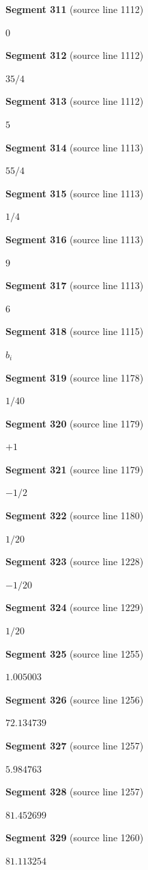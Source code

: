 \documentclass[11pt]{article}
\begin{document}
\textbf{Segment 311} (source line 1112)\par
\( 0 \)\par
\textbf{Segment 312} (source line 1112)\par
\( 35/4 \)\par
\textbf{Segment 313} (source line 1112)\par
\( 5 \)\par
\textbf{Segment 314} (source line 1113)\par
\( 55/4 \)\par
\textbf{Segment 315} (source line 1113)\par
\( 1/4 \)\par
\textbf{Segment 316} (source line 1113)\par
\( 9 \)\par
\textbf{Segment 317} (source line 1113)\par
\( 6 \)\par
\textbf{Segment 318} (source line 1115)\par
\( b_i \)\par
\textbf{Segment 319} (source line 1178)\par
\( 1/40 \)\par
\textbf{Segment 320} (source line 1179)\par
\( +1 \)\par
\textbf{Segment 321} (source line 1179)\par
\( -1/2 \)\par
\textbf{Segment 322} (source line 1180)\par
\( 1/20 \)\par
\textbf{Segment 323} (source line 1228)\par
\( -1/20 \)\par
\textbf{Segment 324} (source line 1229)\par
\( 1/20 \)\par
\textbf{Segment 325} (source line 1255)\par
\( 1.005003 \)\par
\textbf{Segment 326} (source line 1256)\par
\( 72.134739 \)\par
\textbf{Segment 327} (source line 1257)\par
\( 5.984763 \)\par
\textbf{Segment 328} (source line 1257)\par
\( 81.452699 \)\par
\textbf{Segment 329} (source line 1260)\par
\( 81.113254 \)\par
\end{document}
